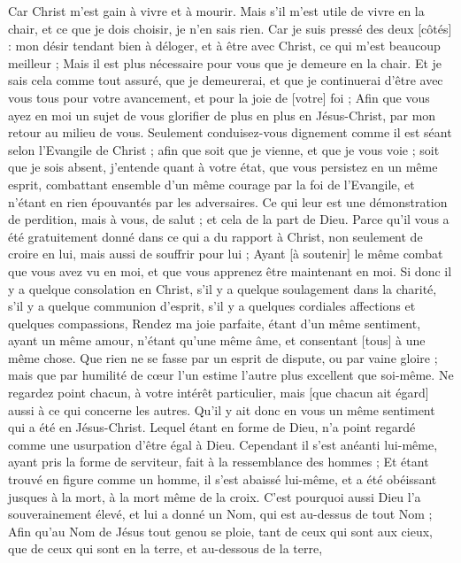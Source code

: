 \begin{multicols}{2}
Car Christ m'est gain à vivre et à mourir.
Mais s'il m'est utile de vivre en la chair, et ce que je dois choisir, je n'en sais rien.
Car je suis pressé des deux [côtés] : mon désir tendant bien à déloger, et à être avec Christ, ce qui m'est beaucoup meilleur ;
Mais il est plus nécessaire pour vous que je demeure en la chair.
Et je sais cela comme tout assuré, que je demeurerai, et que je continuerai d'être avec vous tous pour votre avancement, et pour la joie de [votre] foi ;
Afin que vous ayez en moi un sujet de vous glorifier de plus en plus en Jésus-Christ, par mon retour au milieu de vous.
Seulement conduisez-vous dignement comme il est séant selon l'Evangile de Christ ; afin que soit que je vienne, et que je vous voie ; soit que je sois absent, j'entende quant à votre état, que vous persistez en un même esprit, combattant ensemble d'un même courage par la foi de l'Evangile, et n'étant en rien épouvantés par les adversaires.
Ce qui leur est une démonstration de perdition, mais à vous, de salut ; et cela de la part de Dieu.
Parce qu'il vous a été gratuitement donné dans ce qui a du rapport à Christ, non seulement de croire en lui, mais aussi de souffrir pour lui ;
Ayant [à soutenir] le même combat que vous avez vu en moi, et que vous apprenez être maintenant en moi.
\VerseOne{}Si donc il y a quelque consolation en Christ, s’il y a quelque soulagement dans la charité, s'il y a quelque communion d'esprit, s'il y a quelques cordiales affections et quelques compassions,
Rendez ma joie parfaite, étant d'un même sentiment, ayant un même amour, n'étant qu'une même âme, et consentant [tous] à une même chose.
Que rien ne se fasse par un esprit de dispute, ou par vaine gloire ; mais que par humilité de cœur l’un estime l'autre plus excellent que soi-même.
Ne regardez point chacun, à votre intérêt particulier, mais [que chacun ait égard] aussi à ce qui concerne les autres.
Qu'il y ait donc en vous un même sentiment qui a été en Jésus-Christ.
Lequel étant en forme de Dieu, n'a point regardé comme une usurpation d'être égal à Dieu.
Cependant il s'est anéanti lui-même, ayant pris la forme de serviteur, fait à la ressemblance des hommes ;
Et étant trouvé en figure comme un homme, il s'est abaissé lui-même, et a été obéissant jusques à la mort, à la mort même de la croix.
C'est pourquoi aussi Dieu l'a souverainement élevé, et lui a donné un Nom, qui est au-dessus de tout Nom ;
Afin qu'au Nom de Jésus tout genou se ploie, tant de ceux qui sont aux cieux, que de ceux qui sont en la terre, et au-dessous de la terre,

\end{multicols}

